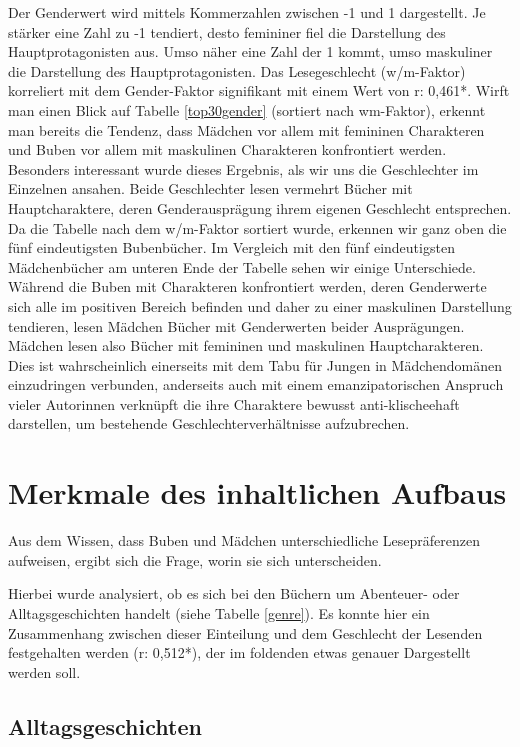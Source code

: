 Der Genderwert wird mittels Kommerzahlen zwischen -1 und 1 dargestellt.
Je stärker eine Zahl zu -1 tendiert, desto femininer fiel die
Darstellung des Hauptprotagonisten aus. Umso näher eine Zahl der 1
kommt, umso maskuliner die Darstellung des Hauptprotagonisten. Das
Lesegeschlecht (w/m-Faktor) korreliert mit dem Gender-Faktor signifikant
mit einem Wert von r: 0,461*. Wirft man einen Blick auf Tabelle
\ref{top30gender} (sortiert nach wm-Faktor), erkennt man bereits die
Tendenz, dass Mädchen vor allem mit femininen Charakteren und Buben vor
allem mit maskulinen Charakteren konfrontiert werden. Besonders
interessant wurde dieses Ergebnis, als wir uns die Geschlechter im
Einzelnen ansahen. Beide Geschlechter lesen vermehrt Bücher mit
Hauptcharaktere, deren Genderausprägung ihrem eigenen Geschlecht
entsprechen. Da die Tabelle nach dem w/m-Faktor sortiert wurde, erkennen
wir ganz oben die fünf eindeutigsten Bubenbücher. Im Vergleich mit den
fünf eindeutigsten Mädchenbücher am unteren Ende der Tabelle sehen wir
einige Unterschiede. Während die Buben mit Charakteren konfrontiert
werden, deren Genderwerte sich alle im positiven Bereich befinden und
daher zu einer maskulinen Darstellung tendieren, lesen Mädchen Bücher
mit Genderwerten beider Ausprägungen. Mädchen lesen also Bücher mit
femininen und maskulinen Hauptcharakteren. Dies ist wahrscheinlich
einerseits mit dem Tabu für Jungen in Mädchendomänen einzudringen
verbunden, anderseits auch mit einem emanzipatorischen Anspruch vieler
Autorinnen verknüpft die ihre Charaktere bewusst anti-klischeehaft
darstellen, um bestehende Geschlechterverhältnisse aufzubrechen.



\section{Merkmale des inhaltlichen Aufbaus}

Aus dem Wissen, dass Buben und Mädchen unterschiedliche Lesepräferenzen
aufweisen, ergibt sich die Frage, worin sie sich unterscheiden.

Hierbei wurde analysiert, ob es sich bei den Büchern um Abenteuer- oder
Alltagsgeschichten handelt (siehe Tabelle \ref{genre}). Es konnte hier
ein Zusammenhang zwischen dieser Einteilung und dem Geschlecht der
Lesenden festgehalten werden (r: 0,512*), der im foldenden etwas genauer
Dargestellt werden soll.



\subsection{Alltagsgeschichten}

